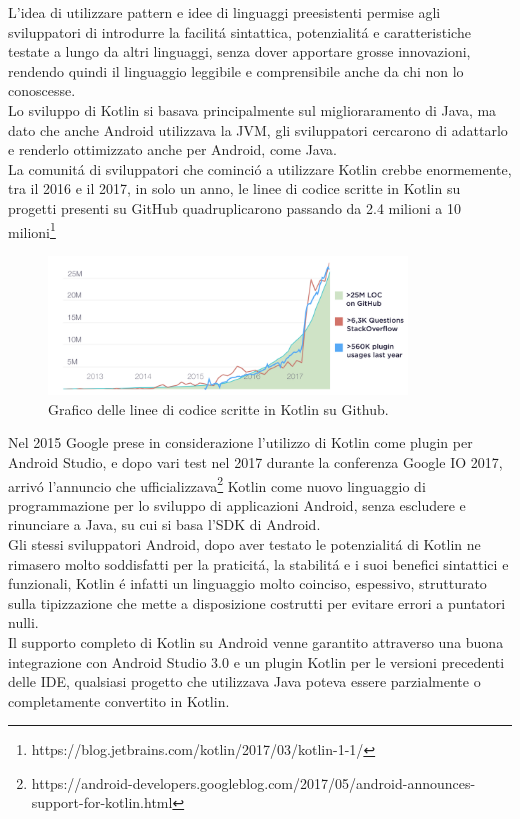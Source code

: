 L'idea di utilizzare pattern e idee di linguaggi preesistenti permise agli sviluppatori di introdurre la facilit\'a sintattica, potenzialit\'a e caratteristiche testate a lungo da altri linguaggi, senza dover apportare grosse innovazioni, rendendo quindi il linguaggio leggibile e comprensibile anche da chi non lo conoscesse.\\
Lo sviluppo di Kotlin si basava principalmente sul miglioraramento di Java, ma dato che anche Android utilizzava la JVM, gli sviluppatori cercarono di adattarlo e renderlo ottimizzato anche per Android, come Java.\\
La comunit\'a di sviluppatori che cominci\'o a utilizzare Kotlin crebbe enormemente, tra il 2016 e il 2017, in solo un anno, le linee di codice scritte in Kotlin su progetti presenti su GitHub quadruplicarono passando da 2.4 milioni a 10 milioni\footnote{https://blog.jetbrains.com/kotlin/2017/03/kotlin-1-1/} \\

\begin{figure}[!hb]
  \centering
  \includegraphics[width=0.85\textwidth]{immagini/kotlin_grafico_incremento.png}
  \caption{Grafico delle linee di codice scritte in Kotlin su Github.}\label{fig:Grafico delle linee di codice scritte in Kotlin su Github}
\end{figure}

Nel 2015 Google prese in considerazione l'utilizzo di Kotlin come plugin per Android Studio, e dopo vari test nel 2017 durante la conferenza Google IO 2017, arriv\'o l'annuncio che ufficializzava\footnote{https://android-developers.googleblog.com/2017/05/android-announces-support-for-kotlin.html} Kotlin come nuovo linguaggio di programmazione per lo sviluppo di applicazioni Android, senza escludere e rinunciare a Java, su cui si basa l'SDK di Android.\\
Gli stessi sviluppatori Android, dopo aver testato le potenzialit\'a di Kotlin ne rimasero molto soddisfatti per la praticit\'a, la stabilit\'a e i suoi benefici sintattici e funzionali, Kotlin \'e infatti un linguaggio molto coinciso, espessivo, strutturato sulla tipizzazione che mette a disposizione costrutti per evitare errori a puntatori nulli.\\
Il supporto completo di Kotlin su Android venne garantito attraverso una buona integrazione con Android Studio 3.0 e un plugin Kotlin per le versioni precedenti delle IDE, qualsiasi progetto che utilizzava Java poteva essere parzialmente o completamente convertito in Kotlin.






